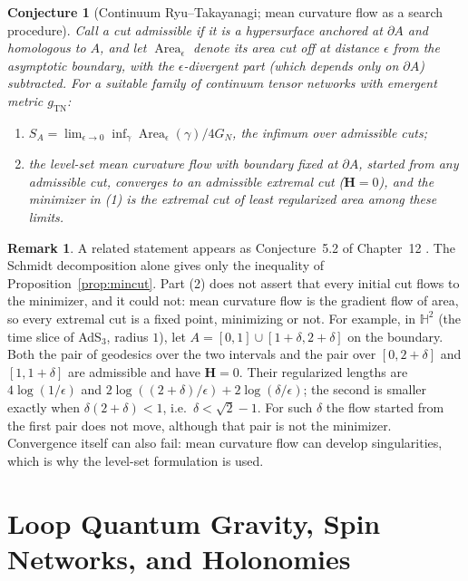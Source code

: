 \documentclass[11pt,a4paper,reqno]{amsart}
\newtheorem{conjecture}[theorem]{Conjecture}
\theoremstyle{definition}
\newtheorem{remark}[theorem]{Remark}
\numberwithin{equation}{section}
\providecommand{\Area}{\operatorname{Area}}
\begin{document}
\begin{conjecture}[Continuum Ryu--Takayanagi; mean curvature flow as a search procedure]
\label{thm:continuous_rt}
Call a cut \emph{admissible} if it is a hypersurface anchored at $\partial A$ and homologous to $A$, and let $\Area_\epsilon$ denote its area cut off at distance $\epsilon$ from the asymptotic boundary, with the $\epsilon$-divergent part (which depends only on $\partial A$) subtracted. For a suitable family of continuum tensor networks with emergent metric $g_{\mathrm{TN}}$:
\begin{enumerate}
    \item $S_A = \lim_{\epsilon \to 0}\inf_\gamma \Area_\epsilon(\gamma)/4G_N$, the infimum over admissible cuts;
    \item the level-set mean curvature flow with boundary fixed at $\partial A$, started from any admissible cut, converges to an admissible extremal cut ($\mathbf{H} = 0$), and the minimizer in (1) is the extremal cut of least regularized area among these limits.
\end{enumerate}
\end{conjecture}

\begin{remark}
A related statement appears as Conjecture~5.2 of Chapter~12 \cite{silvafilho2026grand}. The Schmidt decomposition alone gives only the inequality of Proposition~\ref{prop:mincut}. Part (2) does not assert that every initial cut flows to the minimizer, and it could not: mean curvature flow is the gradient flow of area, so every extremal cut is a fixed point, minimizing or not. For example, in $\mathbb{H}^2$ (the time slice of AdS$_3$, radius $1$), let $A = [0,1] \cup [1+\delta, 2+\delta]$ on the boundary. Both the pair of geodesics over the two intervals and the pair over $[0, 2+\delta]$ and $[1, 1+\delta]$ are admissible and have $\mathbf{H} = 0$. Their regularized lengths are $4\log(1/\epsilon)$ and $2\log((2+\delta)/\epsilon) + 2\log(\delta/\epsilon)$; the second is smaller exactly when $\delta(2+\delta) < 1$, i.e.\ $\delta < \sqrt2 - 1$. For such $\delta$ the flow started from the first pair does not move, although that pair is not the minimizer. Convergence itself can also fail: mean curvature flow can develop singularities, which is why the level-set formulation is used.
\end{remark}

\section{Loop Quantum Gravity, Spin Networks, and Holonomies}
\label{sec:lqg_spin_networks}
\end{document}
